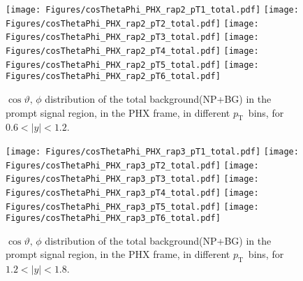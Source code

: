 \documentclass[12pt]{article}
\newcommand{\pt}{$p_{\mathrm{T}}$}
\begin{document}
\begin{figure}[htbp]
\centering
\texttt{[image: Figures/cosThetaPhi\_PHX\_rap2\_pT1\_total.pdf]}
\texttt{[image: Figures/cosThetaPhi\_PHX\_rap2\_pT2\_total.pdf]}
\texttt{[image: Figures/cosThetaPhi\_PHX\_rap2\_pT3\_total.pdf]}
\texttt{[image: Figures/cosThetaPhi\_PHX\_rap2\_pT4\_total.pdf]}
\texttt{[image: Figures/cosThetaPhi\_PHX\_rap2\_pT5\_total.pdf]}
\texttt{[image: Figures/cosThetaPhi\_PHX\_rap2\_pT6\_total.pdf]}
\caption{$\cos\vartheta,\,\phi$ distribution of the total background(NP+BG) in the prompt signal region, 
	in the PHX frame, in different \pt\ bins, for $0.6 < |y| < 1.2$.}
\end{figure}
\clearpage

\begin{figure}[htbp]
\centering
\texttt{[image: Figures/cosThetaPhi\_PHX\_rap3\_pT1\_total.pdf]}
\texttt{[image: Figures/cosThetaPhi\_PHX\_rap3\_pT2\_total.pdf]}
\texttt{[image: Figures/cosThetaPhi\_PHX\_rap3\_pT3\_total.pdf]}
\texttt{[image: Figures/cosThetaPhi\_PHX\_rap3\_pT4\_total.pdf]}
\texttt{[image: Figures/cosThetaPhi\_PHX\_rap3\_pT5\_total.pdf]}
\texttt{[image: Figures/cosThetaPhi\_PHX\_rap3\_pT6\_total.pdf]}
\caption{$\cos\vartheta,\,\phi$ distribution of the total background(NP+BG) in the prompt signal region, 
	in the PHX frame, in different \pt\ bins, for $1.2 < |y| < 1.8$.}
\end{figure}
\clearpage
\end{document}
